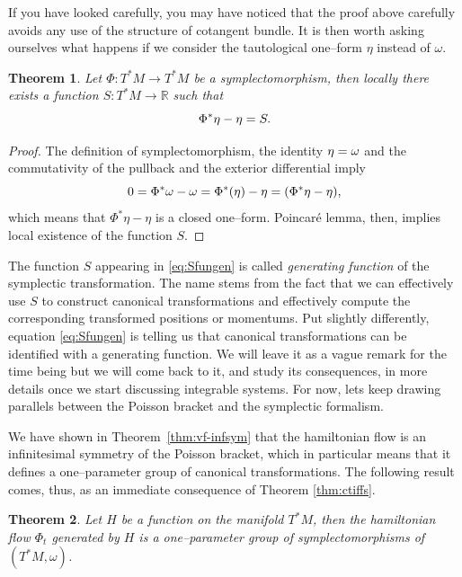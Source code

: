 \documentclass[english,fontsize=11pt,paper=a5,oneside]{scrbook}
\newcommand{\R}{\mathbb{R}}
\let\d\relax
\newcommand{\d}{\mathrm{d}}
\newtheorem{theorem}{Theorem}[chapter]
\theoremstyle{definition}
\begin{document}
If you have looked carefully, you may have noticed that the proof above carefully avoids any use of the structure of cotangent bundle.
It is then worth asking ourselves what happens if we consider the tautological one--form $\eta$ instead of $\omega$.

\begin{theorem}\label{thm:genfun}
  Let $\Phi: T^*M \to T^*M$ be a symplectomorphism, then locally there exists a function $S:T^*M\to\R$ such that
  \begin{equation}\label{eq:Sfungen}
    \Phi^*\eta - \eta = \d S.
  \end{equation}
\end{theorem}
\begin{proof}
  The definition of symplectomorphism, the identity $\d\eta = \omega$ and the commutativity of the pullback and the exterior differential imply
  \begin{equation}
    0 = \Phi^*\omega - \omega = \Phi^*(\d\eta) - \d\eta = \d(\Phi^*\eta - \eta),
  \end{equation}
  which means that $\Phi^*\eta - \eta$ is a closed one--form.
  Poincar\'e lemma, then, implies local existence of the function $S$.
\end{proof}

The function $S$ appearing in \eqref{eq:Sfungen} is called \emph{generating function} of the symplectic transformation.
The name stems from the fact that we can effectively use $S$ to construct canonical transformations and effectively compute the corresponding transformed positions or momentums.
Put slightly differently, equation \eqref{eq:Sfungen} is telling us that canonical transformations can be identified with a generating function.
We will leave it as a vague remark for the time being but we will come back to it, and study its consequences, in more details once we start discussing integrable systems.
For now, lets keep drawing parallels between the Poisson bracket and the symplectic formalism.

We have shown in Theorem~\ref{thm:vf-infsym} that the hamiltonian flow is an infinitesimal symmetry of the Poisson bracket, which in particular means that it defines a one--parameter group of canonical transformations.
The following result comes, thus, as an immediate consequence of Theorem \ref{thm:ctiffs}.

\begin{theorem}
  Let $H$ be a function on the manifold $T^*M$, then the hamiltonian flow $\Phi_t$ generated by $H$ is a one--parameter group of symplectomorphisms of $(T^*M, \omega)$.
\end{theorem}
\end{document}
